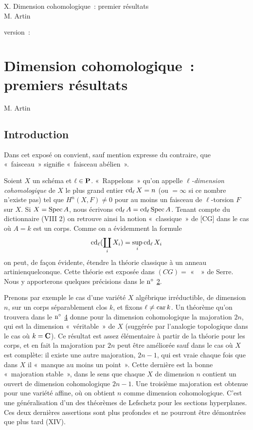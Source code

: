 \documentclass[10pt]{../fichiers-configuration-latex/smfart}
\begin{document}
\begin{center}
X. Dimension cohomologique : premier résultats\\
M. Artin
\end{center}

version : \showgitstatus{}
\tableofcontents

\else
\chapter{Dimension cohomologique : premiers résultats}
\begin{center}
M. Artin
\end{center}
\fi

\setcounter{pageoriginal}{42}

\section{Introduction}\pageoriginale

Dans cet exposé on convient, sauf mention expresse du contraire, que
« faisceau » signifie « faisceau abélien ».

Soient $X$ un schéma et $\ell\in \mathbf{P}$. « Rappelons » qu'on appelle
\emph{$\ell$-dimension cohomologique} de $X$ le plus grand entier
$\operatorname{cd}_{\ell}X=n$ (ou $=\infty$ si ce nombre n'existe pas) tel que
$H^n(X,F)\neq 0$ pour au moins un faisceau de $\ell$-torsion $F$ sur
$X$. Si $X=\operatorname{Spec} A$, nous écrivons $\operatorname{cd}_{\ell} A=\operatorname{cd}_{\ell}\operatorname{Spec}
A$. Tenant compte du dictionnaire (VIII 2) %
on retrouve ainsi la notion « classique » de [CG] dans le cas où $A=k$ est un corps. Comme on
a évidemment la formule
$$
\operatorname{cd}_{\ell}(\coprod_i X_i)=\displaystyle{\mathop{\sup}_i} \operatorname{cd}_{\ell}X_i
$$
on peut, de façon évidente, étendre la théorie classique à un
anneau artinien\pageoriginale quelconque. Cette théorie est exposée dans
$(CG)=$ «  » %
de Serre. Nous y apporterons quelques précisions dans le ${\rm n^{\circ}}$ \hyperref[X.sec2]{2}.

Prenons par exemple le cas d'une variété $X$ algébrique irréductible,
de dimension $n$, sur un corps séparablement clos $k$, et fixons
$\ell\neq \operatorname{car} k$. Un théorème qu'on trouvera dans le ${\rm
  n^{\circ}}$ \hyperref[X.sec4]{4} donne pour la dimension cohomologique la majoration
$2n$, qui est la dimension « véritable » de $X$ (suggérée par
l'analogie topologique dans le cas où $k=\mathbf{C}$). Ce résultat est
assez élémentaire à partir de la théorie pour les corps, et en fait la
majoration par $2n$ peut être améliorée sauf dans le cas où $X$ est
complète: il existe une autre majoration, $2n-1$, qui est vraie chaque
fois que dans $X$ il « manque au moins un point ». Cette dernière
est la bonne « majoration stable », dans le sens que chaque $X$ de
dimension $n$ contient un ouvert de dimension cohomologique
$2n-1$. Une troisième majoration est obtenue pour une variété affine,
où on obtient $n$ comme dimension cohomologique. C'est une
généralisation d'un des théorèmes de Lefschetz pour les sections
hyperplanes. Ces deux dernières assertions sont plus profondes et ne
pourront être démontrées que plus tard (XIV).
\end{document}
